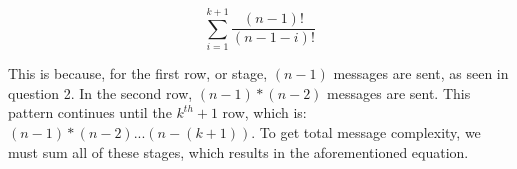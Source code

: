 \documentclass[times]{article}
\begin{document}
		\begin{equation*}
			\sum_{i=1}^{k+1} \frac{(n-1)!}{(n-1-i)!}
		\end{equation*}

		This is because, for the first row, or stage, $(n-1)$ messages are sent, as seen in question 2. In the second row, $(n-1)*(n-2)$ messages are sent. This pattern continues until the $k^{th} + 1$ row, which is: $(n-1)*(n-2)...(n-(k+1))$. To get total message complexity, we must sum all of these stages, which results in the aforementioned equation.
	

	
	
		
\end{document}
